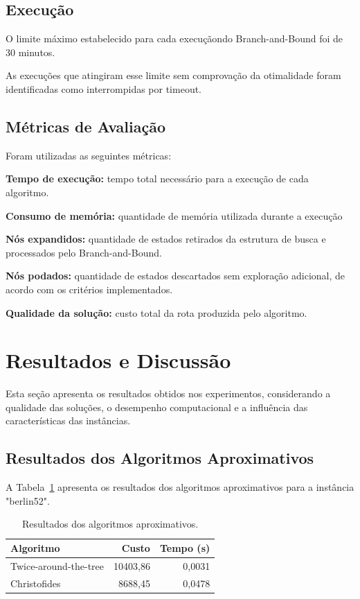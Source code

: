 \documentclass[12pt]{article}
\begin{document}
\subsection{Execução}

O limite máximo estabelecido para cada execuçãondo Branch-and-Bound foi de 30 minutos.

As execuções que atingiram esse limite sem comprovação da otimalidade foram identificadas
como interrompidas por timeout.

\subsection{Métricas de Avaliação}

Foram utilizadas as seguintes métricas:

\textbf{Tempo de execução:} tempo total necessário para a execução de cada algoritmo.

\textbf{Consumo de memória:} quantidade de memória utilizada durante a execução

\textbf{Nós expandidos:} quantidade de estados retirados da estrutura de busca e processados
pelo Branch-and-Bound.

\textbf{Nós podados:} quantidade de estados descartados sem exploração adicional, de acordo
com os critérios implementados.

\textbf{Qualidade da solução:} custo total da rota produzida pelo algoritmo.




	
	\section{Resultados e Discussão}

Esta seção apresenta os resultados obtidos nos experimentos, considerando a qualidade
das soluções, o desempenho computacional e a influência das características das instâncias.

\subsection{Resultados dos Algoritmos Aproximativos}

A Tabela~\ref{tab:aproximativos} apresenta os resultados dos algoritmos aproximativos
para a instância "berlin52".

\begin{table}[H]
\centering
\caption{Resultados dos algoritmos aproximativos.}
\label{tab:aproximativos}
\begin{tabular}{lrr}
\toprule
Algoritmo & Custo & Tempo (s)\\
\midrule
Twice-around-the-tree & 10403,86 & 0,0031\\
Christofides & 8688,45 & 0,0478\\
\bottomrule
\end{tabular}
\end{table}
\end{document}
